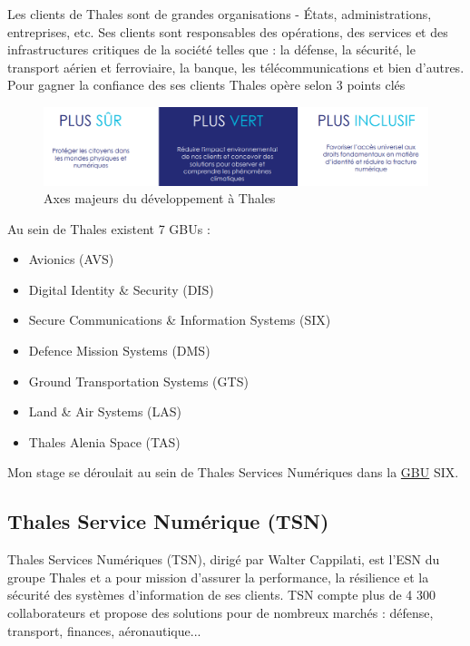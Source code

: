 \documentclass[a4paper, 12pt]{article}
\begin{document}
Les clients de Thales sont de grandes organisations - États, administrations, entreprises, etc. Ses clients sont responsables des opérations, des services et des infrastructures critiques de la société telles que : la défense, la sécurité, le transport aérien et ferroviaire, la banque, les télécommunications et bien d’autres.
Pour gagner la confiance des ses clients Thales opère selon 3 points clés 

\begin{figure}[h]
	\centering
	\includegraphics[width=\textwidth]{img/thales_mission.png}
	\caption{Axes majeurs du développement à Thales}
	\label{thalesmission}
\end{figure}

\noindent Au sein de Thales existent 7 GBUs : 
\begin{itemize}
	\item Avionics (AVS)
	\item Digital Identity \& Security (DIS) 
	\item Secure Communications \& Information Systems (SIX) 
	\item Defence Mission Systems (DMS)  
	\item Ground Transportation Systems (GTS)
	\item Land \& Air Systems (LAS)
	\item Thales Alenia Space (TAS)
\end{itemize}
Mon stage se déroulait au sein de Thales Services Numériques dans la \hyperref[GBU]{GBU} SIX.

\subsection{Thales Service Numérique (TSN)}

Thales Services Numériques (TSN), dirigé par Walter Cappilati, est l’ESN du groupe Thales et a pour mission d’assurer la performance, la résilience et la sécurité des systèmes d’information de ses clients. TSN compte plus de 4 300 collaborateurs et propose des solutions pour de nombreux marchés : défense, transport, finances, aéronautique... \\ 
\end{document}
